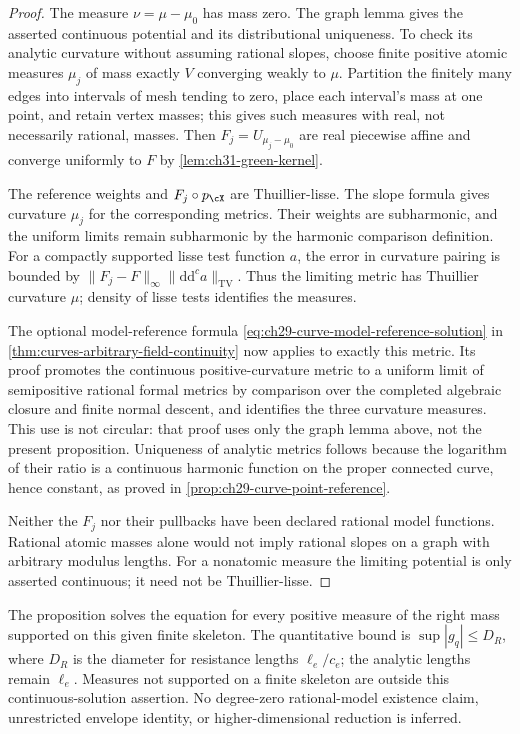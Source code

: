 \begin{proof}
The measure \(\nu=\mu-\mu_0\) has mass zero.  The graph lemma gives
the asserted continuous potential and its distributional uniqueness.
To check its analytic curvature without assuming rational slopes,
choose finite positive atomic measures \(\mu_j\) of mass exactly
\(V\) converging weakly to \(\mu\).  Partition the finitely many
edges into intervals of mesh tending to zero, place each interval's
mass at one point, and retain vertex masses; this gives such measures
with real, not necessarily rational, masses.
Then \(F_j=U_{\mu_j-\mu_0}\) are real piecewise affine and converge
uniformly to \(F\) by \cref{lem:ch31-green-kernel}.

The reference weights and \(F_j\circ p_{\cX}\) are Thuillier-lisse.
The slope formula gives curvature \(\mu_j\) for the corresponding
metrics.  Their weights are subharmonic, and the uniform limits
remain subharmonic by the harmonic comparison definition.
For a compactly supported lisse test function \(a\), the error in
curvature pairing is bounded by
\(\lVert F_j-F\rVert_\infty
  \lVert\mathrm d\mathrm d^ca\rVert_{\mathrm{TV}}\).
Thus the limiting metric has Thuillier curvature \(\mu\);
density of lisse tests \cite[Proposition~3.2.7]{Thu05} identifies
the measures.

The optional model-reference formula
\eqref{eq:ch29-curve-model-reference-solution} in
\cref{thm:curves-arbitrary-field-continuity} now applies to exactly
this metric.  Its proof promotes the continuous positive-curvature
metric to a uniform limit of semipositive rational formal metrics
by comparison over the completed algebraic closure and finite
normal descent, and identifies the three curvature measures.
This use is not circular: that proof uses only the graph lemma above,
not the present proposition.
Uniqueness of analytic metrics follows because the logarithm of
their ratio is a continuous harmonic function on the proper connected
curve, hence constant, as proved in
\cref{prop:ch29-curve-point-reference}.

Neither the \(F_j\) nor their pullbacks have been declared rational
model functions.  Rational atomic masses alone would not imply
rational slopes on a graph with arbitrary modulus lengths.
For a nonatomic measure the limiting potential is only asserted
continuous; it need not be Thuillier-lisse.
\end{proof}

\begin{remark}
\label{rem:ch31-curve-solution-scope}
The proposition solves the equation for every positive measure of
the right mass supported on this given finite skeleton.
The quantitative bound is
\(\sup|g_q|\leq D_R\), where \(D_R\) is the diameter for resistance
lengths \(\ell_e/c_e\); the analytic lengths remain \(\ell_e\).
Measures not supported on a finite skeleton are outside this
continuous-solution assertion.
No degree-zero rational-model existence claim, unrestricted envelope
identity, or higher-dimensional reduction is inferred.
\end{remark}


